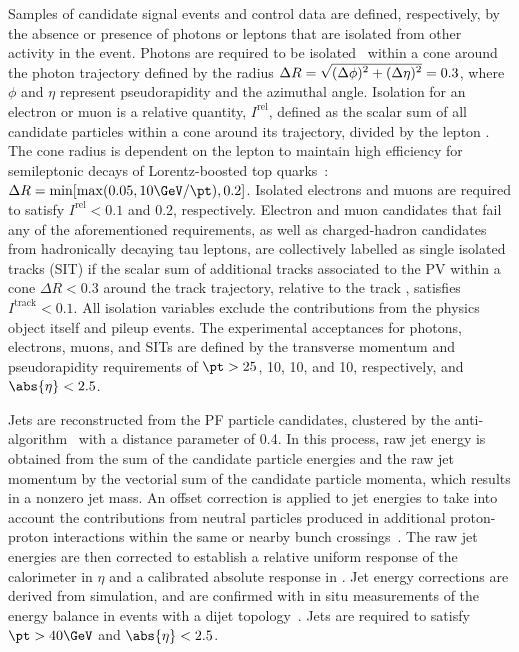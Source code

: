 Samples of candidate signal events and control data are defined,
respectively, by the absence or presence of photons or leptons that
are isolated from other activity in the event. Photons are required to
be isolated~\cite{Khachatryan:2015iwa} within a cone around the photon
trajectory defined by the radius $\Delta R =
\sqrt{\smash[b]{(\Delta\phi)^2 + (\Delta\eta)^2}} = 0.3$, where $\phi$
and $\eta$ represent pseudorapidity and the azimuthal angle.
Isolation for an electron or muon is a relative quantity,
$I^\text{rel}$, defined as the scalar \pt sum of all candidate
particles within a cone around its trajectory, divided by the lepton
\pt. The cone radius is dependent on the lepton \pt to maintain high
efficiency for semileptonic decays of Lorentz-boosted top
quarks~\cite{Rehermann:2010vq}: $\Delta R = \min [ \max( 0.05, 10\GeV
/ \pt ), 0.2 ]$. Isolated electrons and muons are required to satisfy
$I^\text{rel} < 0.1$ and 0.2, respectively.  Electron and muon
candidates that fail any of the aforementioned requirements, as well
as charged-hadron candidates from hadronically decaying tau leptons,
are collectively labelled as single isolated tracks (SIT) if the
scalar \pt sum of additional tracks associated to the PV within a cone
$\Delta R < 0.3$ around the track trajectory, relative to the track
\pt, satisfies $I^\text{track} < 0.1$. All isolation variables exclude
the contributions from the physics object itself and pileup
events. The experimental acceptances for photons, electrons, muons,
and SITs are defined by the transverse momentum and pseudorapidity
requirements of $\pt > 25$, 10, 10, and 10\GeV, respectively, and
$\abs{\eta} < 2.5$. 

Jets are reconstructed from the PF particle candidates, clustered by
the anti-\kt algorithm~\cite{Cacciari:2008gp, Cacciari:2011ma} with a
distance parameter of 0.4. In this process, raw jet energy is obtained
from the sum of the candidate particle energies and the raw jet
momentum by the vectorial sum of the candidate particle momenta, which
results in a nonzero jet mass. An offset correction is applied to jet
energies to take into account the contributions from neutral particles
produced in additional proton-proton interactions within the same or
nearby bunch crossings~\cite{Cacciari:2007fd, CMS-PAS-JME-14-001}. The
raw jet energies are then corrected to establish a relative uniform
response of the calorimeter in $\eta$ and a calibrated absolute
response in \pt. Jet energy corrections are derived from simulation,
and are confirmed with in situ measurements of the energy balance in
events with a dijet topology~\cite{Khachatryan:2016kdb}. Jets are
required to satisfy $\pt > 40\GeV$ and $\abs{\eta} < 2.5$.

